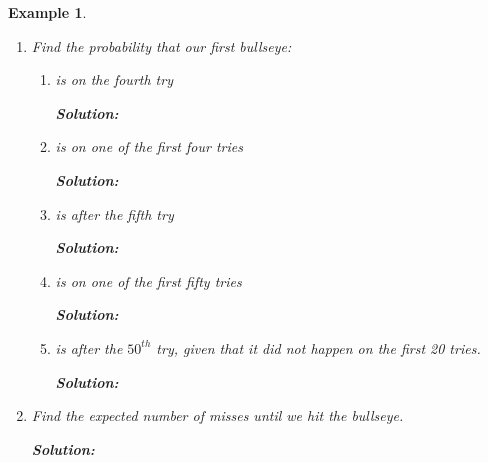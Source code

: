 \documentclass[12pt]{amsart}
\newtheorem{example}[theorem]{Example}
\begin{document}
{\begin{example}
\begin{enumerate}
\newpage

\item Find the probability that our first bullseye: 
	\begin{enumerate}
	\item is on the fourth try
	
	\textbf{Solution:}
\vspace{3cm}

	\item is on one of the first four tries
	
		\textbf{Solution:}
\vspace{3cm}
	\item is after the fifth try
	
		\textbf{Solution:}



\newpage


\vspace{5cm}
	\item is on one of the first fifty tries
		
		\textbf{Solution:}
\vspace{7cm}

	\item is after the $50^{th}$ try, given that it did not happen on the first 20 tries.
			
		\textbf{Solution:}
	\end{enumerate}

\newpage

\item Find the expected number of misses until we hit the bullseye.
		
		\textbf{Solution:}
\end{enumerate}

\end{example}





}
\end{document}
